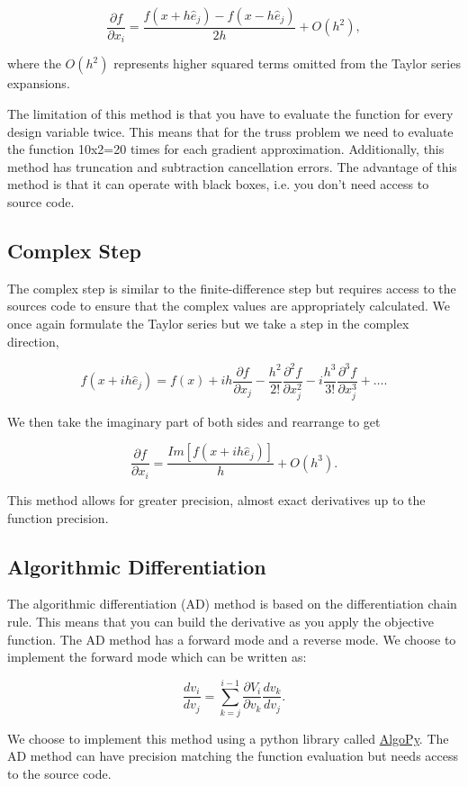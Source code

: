 \documentclass{article}
\begin{document}
$$ \frac{\partial f}{\partial x_i} = \frac{f(x+h\hat{e}_j) - f(x-h\hat{e}_j)}{2h} + O(h^2), $$

where the $O(h^2)$ represents higher squared terms omitted from the Taylor series expansions. 

The limitation of this method is that you have to evaluate the function for every design variable twice. This means that for the truss problem we need to evaluate the function 10x2=20 times for each gradient approximation. Additionally, this method has truncation and subtraction cancellation errors. The advantage of this method is that it can operate with black boxes, i.e. you don't need access to source code.

\subsection*{Complex Step}

The complex step is similar to the finite-difference step but requires access to the sources code to ensure that the complex values are appropriately calculated. We once again formulate the Taylor series but we take a step in the complex direction, 

$$ f(x+ih\hat{e}_j)=f(x)+ih\frac{\partial f}{\partial x_j} - \frac{h^2}{2!}\frac{\partial^2f}{\partial x_j^2}-i\frac{h^3}{3!}\frac{\partial^3f}{\partial x_j^3
} + \dots .$$

We then take the imaginary part of both sides and rearrange to get

$$ \frac{\partial f}{\partial x_i} = \frac{Im[f(x+ih\hat{e}_j)]}{h} + O(h^3). $$

This method allows for greater precision, almost exact derivatives up to the function precision.

\subsection*{Algorithmic Differentiation}

The algorithmic differentiation (AD) method is based on the differentiation chain rule. This means that you can build the derivative as you apply the objective function. The AD method has a forward mode and a reverse mode. We choose to implement the forward mode which can be written as:

$$ \frac{dv_i}{dv_j}=\sum_{k=j}^{i-1}\frac{\partial V_i}{\partial v_k}\frac{dv_k}{dv_j}.$$ 

We choose to implement this method using a python library called \href{https://pythonhosted.org/algopy/}{AlgoPy}. The AD method can have precision matching the function evaluation but needs access to the source code.
\end{document}

